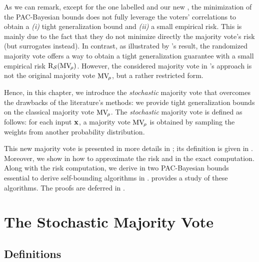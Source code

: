 As we can remark, except for the one labelled \algolacasse and our new , the minimization of the PAC-Bayesian bounds does not fully leverage the voters' correlations to obtain a {\it (i)} tight generalization bound and {\it (ii)} a small empirical risk.
This is mainly due to the fact that they do not minimize directly the majority vote's risk (but surrogates instead).
In contrast, as illustrated by \citet{Lacasse2010}'s result, the randomized majority vote offers a way to obtain a tight generalization guarantee with a small empirical risk $\text{R}_{\mathcal{S}}(\text{MV}_{\!\rho})$.
However, the considered majority vote in \citet{LacasseLavioletteMarchandTurgeonBoutin2010}'s approach is not the original majority vote $\text{MV}_{\!\rho}$, but a rather restricted form.

Hence, in this chapter, we introduce the {\it stochastic} majority vote that overcomes the drawbacks of the literature's methods: we provide tight generalization bounds on the classical majority vote $\text{MV}_{\!\rho}$.
The {\it stochastic} majority vote is defined as follows: for each input $\mathbf{x}$, a majority vote $\text{MV}_{\!\rho}$ is obtained by sampling the weights from another probability distribution.

This new majority vote is presented in more details in ; its definition is given in .
Moreover, we show in  how to approximate the risk and in  the exact computation.
Along with the risk computation, we derive in  two PAC-Bayesian bounds essential to derive self-bounding algorithms in .
 provides a study of these algorithms.
The proofs are deferred in . 

\section{The Stochastic Majority Vote}
\label{chap:mv-sto:sec:mv-sto}


\subsection{Definitions}
\label{chap:mv-sto:sec:def}

